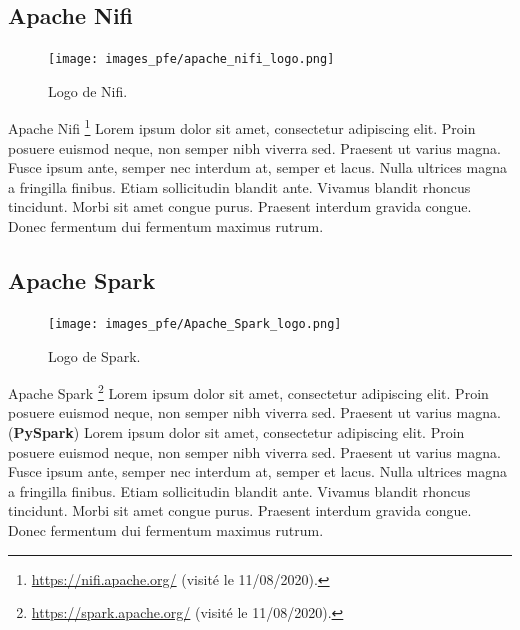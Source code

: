 \subsection*{Apache Nifi}
\begin{figure}
  \centering
  \texttt{[image: images\_pfe/apache\_nifi\_logo.png]}
  \caption{Logo de Nifi.}
\end{figure}
\FloatBarrier
Apache Nifi \footnote{\url{https://nifi.apache.org/} (visité le 11/08/2020).} Lorem ipsum dolor sit amet, consectetur adipiscing elit. Proin posuere euismod neque, non semper nibh viverra sed. Praesent ut varius magna. Fusce ipsum ante, semper nec interdum at, semper et lacus. Nulla ultrices magna a fringilla finibus. Etiam sollicitudin blandit ante. Vivamus blandit rhoncus tincidunt. Morbi sit amet congue purus. Praesent interdum gravida congue. Donec fermentum dui fermentum maximus rutrum.


\subsection*{Apache Spark}
\begin{figure}
  \centering
  \texttt{[image: images\_pfe/Apache\_Spark\_logo.png]}
  \caption{Logo de Spark.}
\end{figure}
\FloatBarrier
Apache Spark \footnote{\url{https://spark.apache.org/} (visité le 11/08/2020).} Lorem ipsum dolor sit amet, consectetur adipiscing elit. Proin posuere euismod neque, non semper nibh viverra sed. Praesent ut varius magna. (\textbf{PySpark}) Lorem ipsum dolor sit amet, consectetur adipiscing elit. Proin posuere euismod neque, non semper nibh viverra sed. Praesent ut varius magna. Fusce ipsum ante, semper nec interdum at, semper et lacus. Nulla ultrices magna a fringilla finibus. Etiam sollicitudin blandit ante. Vivamus blandit rhoncus tincidunt. Morbi sit amet congue purus. Praesent interdum gravida congue. Donec fermentum dui fermentum maximus rutrum.


